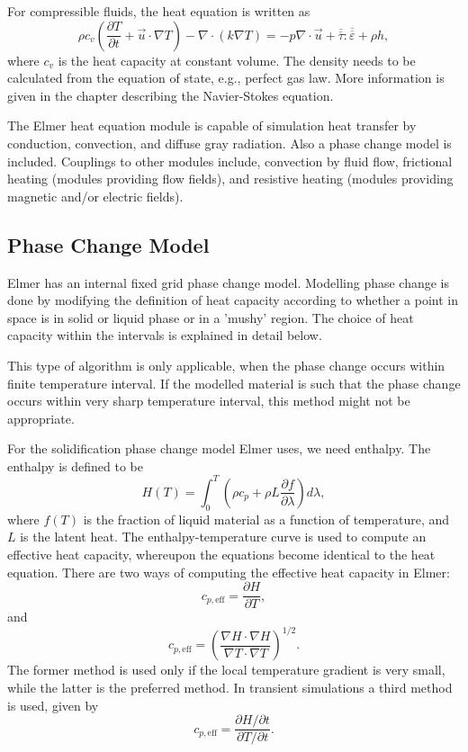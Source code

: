 \begin{versiona}
For compressible fluids, the heat equation is written as
\begin{equation}
\rho c_v\left(\frac{\partial T}{\partial t} + \vec{u}\cdot\nabla T\right) -
\nabla\cdot\left(k\nabla T\right) = - p \nabla\cdot\vec{u} 
+ \overline{\overline\tau}:\overline{\overline \varepsilon}
+ \rho h,
\end{equation}
where $c_v$ is the heat capacity at constant volume. The density needs to be
calculated from the equation of state, e.g., perfect gas law. More
information is given in the chapter describing the Navier-Stokes equation.

The Elmer heat equation module is capable of simulation heat transfer by
conduction, convection, and diffuse gray radiation. Also a phase change
model is included. Couplings to other modules include, convection by
fluid flow, frictional heating (modules providing flow fields), and
resistive heating (modules providing magnetic and/or electric fields).


\subsection{Phase Change Model}

Elmer has an internal fixed grid phase change model. Modelling phase change is done
by modifying the definition of heat capacity according to whether
a point in space is in solid or liquid phase or in a 'mushy' region.
The choice of heat capacity within the intervals is explained in detail
below.

This type of algorithm is only applicable, when the phase change occurs
within finite temperature interval. If the modelled material is such that
the phase change occurs within very sharp temperature interval, this
method might not be appropriate.

For the solidification phase change model Elmer uses,  we need enthalpy.
The enthalpy is defined to be
\begin{equation}
H(T) = \int_0^T \left ( \rho c_p + \rho L\frac{\partial f}{\partial \lambda}\right )d\lambda,
\end{equation}
where $f(T)$ is the fraction of liquid material as a function of
temperature, and $L$ is the latent heat.
The enthalpy-temperature curve is used
to compute an effective heat capacity, whereupon the equations become identical
to the heat equation. There are two ways of computing the effective heat capacity in Elmer:
\begin{equation}
c_{p,\mathrm{eff}} = \frac{\partial H}{\partial T},
\end{equation}
and
\begin{equation}
c_{p,\mathrm{eff}} = \left ( \frac{\nabla H\cdot\nabla H}{\nabla T\cdot\nabla T}\right )^{1/2}.
\end{equation}
The former method is used only if the local temperature gradient is very small, while
the latter is the preferred method. In transient simulations a third method is used, given
by
\begin{equation}
c_{p,\mathrm{eff}} = \frac{\partial H/\partial t}{\partial T/\partial t}.
\end{equation}


\end{versiona}
